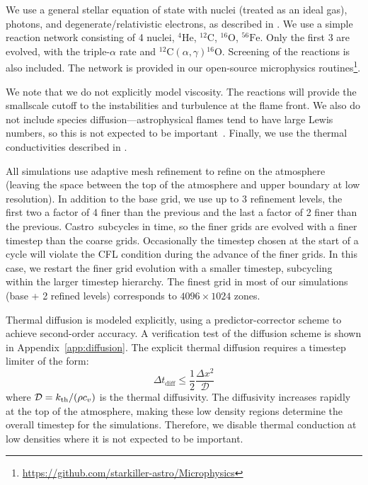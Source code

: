 \documentclass[twocolumn,times,tighten]{aastex62}
\newcommand{\kth}{k_{\rm th}}
\newcommand{\isot}[2]{$^{#2}\mathrm{#1}$}
\newcommand{\isotm}[2]{{}^{#2}\mathrm{#1}}
\newcommand{\castro}{{\sf Castro}}
\begin{document}
We use a general stellar equation of state with nuclei (treated as an
ideal gas), photons, and degenerate/relativistic electrons, as
described in \cite{timmes_swesty:2000}.  We use a simple reaction
network consisting of 4 nuclei, \isot{He}{4}, \isot{C}{12},
\isot{O}{16}, \isot{Fe}{56}.  Only the first 3 are evolved, with the
triple-$\alpha$ rate and $\isotm{C}{12}(\alpha, \gamma)\isotm{O}{16}$.
Screening of the reactions is also included.  The network is provided
in our open-source microphysics
routines\footnote{\url{https://github.com/starkiller-astro/Microphysics}}.

We note that we do not explicitly model viscosity.  The reactions will
provide the smallscale cutoff to the instabilities and turbulence at
the flame front.  We also do not include species
diffusion---astrophysical flames tend to have large Lewis numbers, so
this is not expected to be important~\citep{timmeswoosley:1992}.
Finally, we use the thermal conductivities described in
\citet{Timmes00}.


All simulations use adaptive mesh refinement to refine on the
atmosphere (leaving the space between the top of the atmosphere and
upper boundary at low resolution).  In addition to the base grid, we
use up to 3 refinement levels, the first two a factor of 4 finer than
the previous and the last a factor of 2 finer than the previous.
\castro\ subcycles in time, so the finer grids are evolved with a
finer timestep than the coarse grids.  Occasionally the timestep
chosen at the start of a cycle will violate the CFL condition during
the advance of the finer grids.  In this case, we restart the finer
grid evolution with a smaller timestep, subcycling within the larger
timestep hierarchy.  The finest grid in most of our simulations (base
+ 2 refined levels) corresponds to $4096\times 1024$ zones.

Thermal diffusion is modeled explicitly, using a predictor-corrector
scheme to achieve second-order accuracy.  A verification test of the
diffusion scheme is shown in Appendix~\ref{app:diffusion}.  The
explicit thermal diffusion requires a timestep limiter of the form:
\begin{equation}
\Delta t_\mathrm{diff} \le \frac{1}{2} \frac{\Delta x^2}{\mathcal{D}}
\end{equation}
where $\mathcal{D} = \kth/(\rho c_v)$ is the thermal diffusivity.  The
diffusivity increases rapidly at the top of the atmosphere, making
these low density regions determine the overall timestep for the
simulations.  Therefore, we disable thermal conduction at low
densities where it is not expected to be important.
\end{document}
